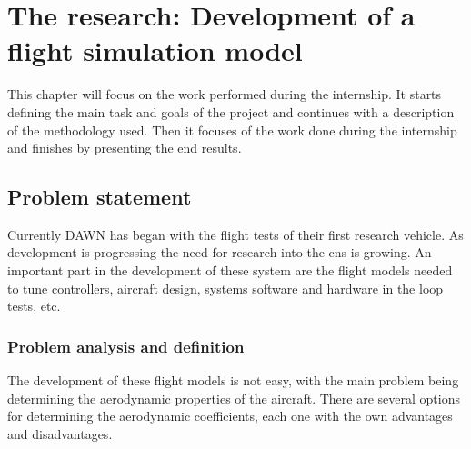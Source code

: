 \chapter{The research: Development of a flight simulation model}
This chapter will focus on the work performed during the internship. It starts defining the main task and goals of the project and continues with a description of the methodology used. Then it focuses of the work done during the internship and finishes by presenting the end results.

\section{Problem statement}
Currently DAWN has began with the flight tests of their first research vehicle. As development is progressing the need for research into the \gls{cns} is growing. An important part in the development of these system are the flight models needed to tune controllers, aircraft design, systems software and hardware in the loop tests, etc. 

\subsection{Problem analysis and definition}
The development of these flight models is not easy, with the main problem being determining the aerodynamic properties of the aircraft. There are several options for determining the aerodynamic coefficients, each one with the own advantages and disadvantages.

